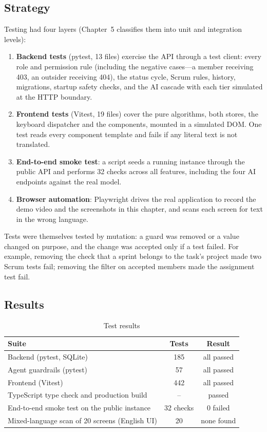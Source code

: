 \documentclass[../main.tex]{subfiles}
\begin{document}
\subsection{Strategy}
Testing had four layers (Chapter~5 classifies them into unit and integration levels):
\begin{enumerate}
  \item \textbf{Backend tests} (pytest, 13 files) exercise the API through a test client: every
        role and permission rule (including the negative cases---a member receiving 403, an outsider
        receiving 404), the status cycle, Scrum rules, history, migrations, startup safety checks,
        and the AI cascade with each tier simulated at the HTTP boundary.
  \item \textbf{Frontend tests} (Vitest, 19 files) cover the pure algorithms, both stores, the
        keyboard dispatcher and the components, mounted in a simulated DOM. One test reads every
        component template and fails if any literal text is not translated.
  \item \textbf{End-to-end smoke test}: a script seeds a running instance through the public API
        and performs 32 checks across all features, including the four AI endpoints against the
        real model.
  \item \textbf{Browser automation}: Playwright drives the real application to record the demo
        video and the screenshots in this chapter, and scans each screen for text in the wrong
        language.
\end{enumerate}
Tests were themselves tested by mutation: a guard was removed or a value changed on purpose, and the
change was accepted only if a test failed. For example, removing the check that a sprint belongs to
the task's project made two Scrum tests fail; removing the filter on accepted members made the
assignment test fail.

\subsection{Results}
\begin{table}[H]
\centering
\caption{Test results}\label{tab:tests}
\renewcommand{\arraystretch}{1.2}
\begin{tabular}{|p{6cm}|c|c|}
\hline
\textbf{Suite} & \textbf{Tests} & \textbf{Result} \\ \hline
Backend (pytest, SQLite) & 185 & all passed \\ \hline
Agent guardrails (pytest) & 57 & all passed \\ \hline
Frontend (Vitest) & 442 & all passed \\ \hline
TypeScript type check and production build & -- & passed \\ \hline
End-to-end smoke test on the public instance & 32 checks & 0 failed \\ \hline
Mixed-language scan of 20 screens (English UI) & 20 & none found \\ \hline
\end{tabular}
\end{table}
\end{document}
